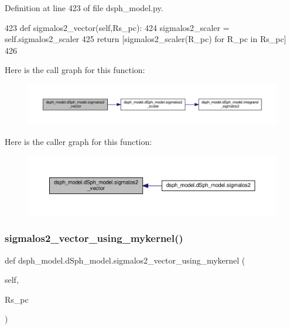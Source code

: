 Definition at line 423 of file dsph\+\_\+model.\+py.


\begin{DoxyCode}
423     \textcolor{keyword}{def }sigmalos2\_vector(self,Rs\_pc):
424         sigmalos2\_scaler = self.sigmalos2\_scaler
425         \textcolor{keywordflow}{return} [sigmalos2\_scaler(R\_pc) \textcolor{keywordflow}{for} R\_pc \textcolor{keywordflow}{in} Rs\_pc]
426     
\end{DoxyCode}
Here is the call graph for this function\+:
\nopagebreak
\begin{figure}[H]
\begin{center}
\leavevmode
\includegraphics[width=350pt]{d0/d25/classdsph__model_1_1dSph__model_a5170edb309402dc101ea76871645e65f_cgraph}
\end{center}
\end{figure}
Here is the caller graph for this function\+:
\nopagebreak
\begin{figure}[H]
\begin{center}
\leavevmode
\includegraphics[width=350pt]{d0/d25/classdsph__model_1_1dSph__model_a5170edb309402dc101ea76871645e65f_icgraph}
\end{center}
\end{figure}
\mbox{\label{classdsph__model_1_1dSph__model_a00cd796cf178fe8b3435e941976e8f27}} 
\subsubsection{\texorpdfstring{sigmalos2\+\_\+vector\+\_\+using\+\_\+mykernel()}{sigmalos2\_vector\_using\_mykernel()}}
{\footnotesize\ttfamily def dsph\+\_\+model.\+d\+Sph\+\_\+model.\+sigmalos2\+\_\+vector\+\_\+using\+\_\+mykernel (\begin{DoxyParamCaption}\item[{}]{self,  }\item[{}]{Rs\+\_\+pc }\end{DoxyParamCaption})}



